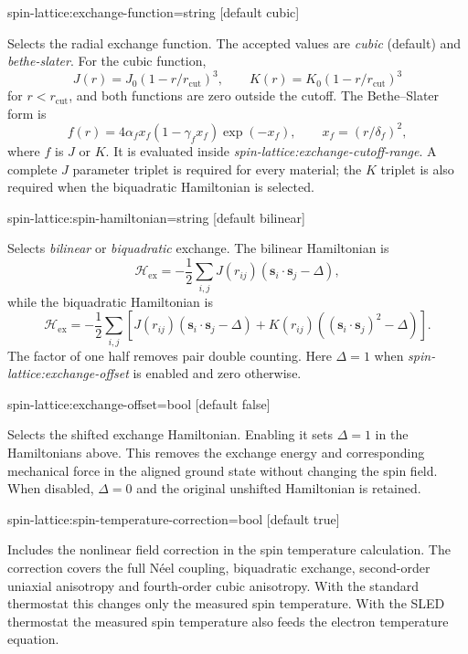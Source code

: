 {\zicf spin-lattice:exchange-function=string [default cubic]}
Selects the radial exchange function. The accepted values are \textit{cubic} (default) and \textit{bethe-slater}.
For the cubic function,
\[
J(r)=J_0(1-r/r_{\mathrm{cut}})^3,\qquad
K(r)=K_0(1-r/r_{\mathrm{cut}})^3
\]
for $r<r_{\mathrm{cut}}$, and both functions are zero outside the cutoff.
The Bethe--Slater form is
\[
f(r)=4\alpha_f x_f(1-\gamma_f x_f)\exp(-x_f),\qquad
x_f=(r/\delta_f)^2,
\]
where $f$ is $J$ or $K$. It is evaluated inside \textit{spin-lattice:exchange-cutoff-range}. A complete $J$ parameter triplet is
required for every material; the $K$ triplet is also required when the biquadratic Hamiltonian is selected.

{\zicf spin-lattice:spin-hamiltonian=string [default bilinear]}
Selects \textit{bilinear} or \textit{biquadratic} exchange. The bilinear Hamiltonian is
\[
\mathcal{H}_{\mathrm{ex}}=-\frac{1}{2}\sum_{i,j}
J(r_{ij})(\mathbf{s}_i\cdot\mathbf{s}_j-\Delta),
\]
while the biquadratic Hamiltonian is
\[
\mathcal{H}_{\mathrm{ex}}=-\frac{1}{2}\sum_{i,j}\left[
J(r_{ij})(\mathbf{s}_i\cdot\mathbf{s}_j-\Delta)
+K(r_{ij})((\mathbf{s}_i\cdot\mathbf{s}_j)^2-\Delta)\right].
\]
The factor of one half removes pair double counting. Here $\Delta=1$ when \textit{spin-lattice:exchange-offset} is enabled and zero otherwise.

{\zicf spin-lattice:exchange-offset=bool [default false]}
Selects the shifted exchange Hamiltonian. Enabling it sets $\Delta=1$ in the Hamiltonians above. This removes the exchange energy and corresponding mechanical force in
the aligned ground state without changing the spin field. When disabled, $\Delta=0$ and the original unshifted Hamiltonian is retained.

{\zicf spin-lattice:spin-temperature-correction=bool [default true]}
Includes the nonlinear field correction in the spin temperature calculation. The correction covers the full N\'eel coupling, biquadratic exchange, second-order uniaxial anisotropy and fourth-order cubic anisotropy. With the standard thermostat this changes only the measured spin temperature. With the SLED thermostat the measured spin temperature also feeds the electron temperature equation.

